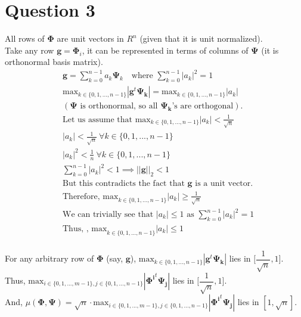 \documentclass[fleqn, 11pt]{article}
\begin{document}
\newpage
\section*{Question 3}
\setcounter{equation}{0}

All rows of $\boldsymbol{\Phi}$ are unit vectors in $R^n$ (given that it is unit normalized). \\
Take any row $\boldsymbol{g} = \boldsymbol{\Phi}_i$, it can be represented in terms of columns of $\boldsymbol{\Psi}$ (it is orthonormal basis matrix). \\
\begin{equation*}
    \begin{aligned}
        & \boldsymbol{g} = \sum_{k=0}^{n-1} a_k \boldsymbol{\Psi}_k \hspace{1em} \text{where } \sum_{k=0}^{n-1} |a_k|^2 = 1\\
        & \text{max}_{k \in \{0,1,...,n-1\}} |\boldsymbol{g}^t \boldsymbol{\Psi_k}| = \text{max}_{k \in \{0,1,...,n-1\}} |a_k| \\
        & (\boldsymbol{\Psi} \text{ is orthonormal, so all } \boldsymbol{\Psi_k} \text{'s are orthogonal}). \\
        & \text{Let us assume that max}_{k \in \{0,1,...,n-1\}} |a_k| < \frac{1}{\sqrt{n}} \\
        & |a_k| < \frac{1}{\sqrt{n}} \ \forall k \in \{0,1,...,n-1\} \\
        & |a_k|^2 < \frac{1}{n} \ \forall k \in \{0,1,...,n-1\} \\
        & \sum_{k=0}^{n-1} |a_k|^2 < 1 \implies ||\boldsymbol{g}||_2 < 1\\
        & \text{But this contradicts the fact that $\boldsymbol{g}$ is a unit vector}. \\
        & \text{Therefore, max}_{k \in \{0,1,...,n-1\}} |a_k| \ge \frac{1}{\sqrt{n}} \\
        & \text{We can trivially see that } |a_k| \le 1 \text{ as }\sum_{k=0}^{n-1} |a_k|^2 = 1 \\
        & \text{Thus, , max}_{k \in \{0,1,...,n-1\}} |a_k| \le 1 \\
    \end{aligned}
\end{equation*}

For any arbitrary row of $\boldsymbol{\Phi}$ (say, $\boldsymbol{g}$), $\text{max}_{k \in \{0,1,...,n-1\}} |\boldsymbol{g}^t \boldsymbol{\Psi_k}|$ lies in $\bigg[ \dfrac{1}{\sqrt{n}}, 1 \bigg]$. \\
Thus, $\textrm{max}_{i \in \{0,1,...,m-1\}, j \in \{0,1,...,n-1\}} |\boldsymbol{\Phi^i}^t \boldsymbol{\Psi_j}|$ lies in $\bigg[ \dfrac{1}{\sqrt{n}}, 1 \bigg]$. \\
And, $\mu(\boldsymbol{\Phi},\boldsymbol{\Psi}) = \sqrt{n} \cdot \text{max}_{i \in \{0,1,...,m-1\}, j \in \{0,1,...,n-1\}} |\boldsymbol{\Phi^i}^t \boldsymbol{\Psi_j}|$ lies in $[1, \sqrt{n}]$. \\
\end{document}
